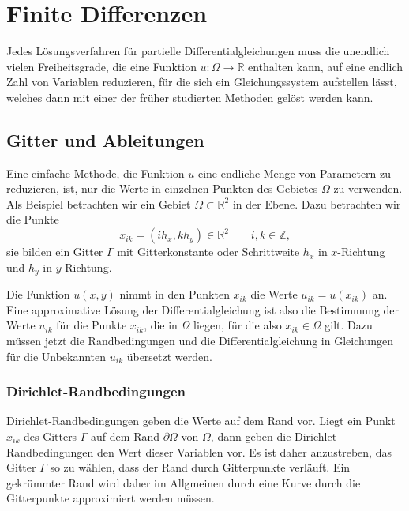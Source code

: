 %
%
%
\section{Finite Differenzen
\label{section:finite-differenzen}}
Jedes Lösungsverfahren für partielle Differentialgleichungen muss die
unendlich vielen Freiheitsgrade, die eine Funktion
$u\colon\Omega\to\mathbb R$ enthalten kann, auf eine endlich Zahl von
Variablen reduzieren, für die sich ein Gleichungssystem aufstellen 
lässt, welches dann mit einer der früher studierten Methoden
gelöst werden kann.

%
%
\subsection{Gitter und Ableitungen
\label{pde:subsection:gitter}}
Eine einfache Methode, die Funktion $u$ eine endliche Menge von Parametern
zu reduzieren, ist, nur die Werte in einzelnen Punkten des Gebietes 
$\Omega$ zu verwenden.
Als Beispiel betrachten wir ein Gebiet $\Omega\subset\mathbb R^2$
in der Ebene.
Dazu betrachten wir die Punkte
\[
x_{ik} = (ih_x, kh_y) \in \mathbb R^2
\qquad
i,k\in\mathbb Z,
\]
sie bilden ein Gitter $\Gamma$ mit Gitterkonstante oder Schrittweite
$h_x$ in $x$-Richtung und $h_y$ in $y$-Richtung.

Die Funktion $u(x,y)$ nimmt in den Punkten $x_{ik}$ die Werte
$u_{ik} = u(x_{ik})$ an.
Eine approximative Lösung der Differentialgleichung ist also
die Bestimmung der Werte $u_{ik}$ für die Punkte $x_{ik}$, die in
$\Omega$ liegen, für die also $x_{ik}\in\Omega$ gilt.
Dazu müssen jetzt die Randbedingungen und die Differentialgleichung
in Gleichungen für die Unbekannten $u_{ik}$ übersetzt werden.

\subsubsection{Dirichlet-Randbedingungen}
Dirichlet-Randbedingungen geben die Werte auf dem Rand vor.
Liegt ein Punkt $x_{ik}$ des Gitters $\Gamma$ auf dem Rand $\partial\Omega$
von $\Omega$, dann geben die Dirichlet-Randbedingungen den Wert
dieser Variablen vor.
Es ist daher anzustreben, das Gitter $\Gamma$ so zu wählen, dass 
der Rand durch Gitterpunkte verläuft.
Ein gekrümmter Rand wird daher im Allgmeinen durch eine Kurve durch
die Gitterpunkte approximiert werden müssen.

